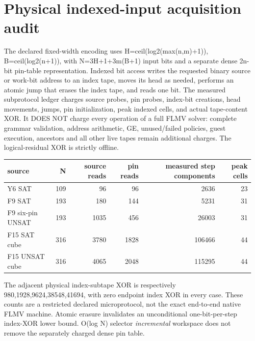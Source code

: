 \documentclass[10pt]{article}
\begin{document}
\section{Physical indexed-input acquisition audit}
The declared fixed-width encoding uses H=ceil(log2(max(n,m)+1)), B=ceil(log2(n+1)), with N=3H+1+3m(B+1) input bits and a separate dense 2n-bit pin-table representation. Indexed bit access writes the requested binary source or work-bit address to an index tape, moves its head as needed, performs an atomic jump that erases the index tape, and reads one bit. The measured subprotocol ledger charges source probes, pin probes, index-bit creations, head movements, jumps, pin initialization, peak indexed cells, and actual tape-content XOR. It DOES NOT charge every operation of a full FLMV solver: complete grammar validation, address arithmetic, GE, unused/failed policies, guest execution, ancestors and all other live tapes remain additional charges. The logical-residual XOR is strictly offline.
\begin{center}
\begin{tabular}{lrrrrr}\hline
source & N & source reads & pin reads & measured step components & peak cells\\\hline
Y6 SAT & 109 & 96 & 96 & 2636 & 23\\
F9 SAT & 193 & 180 & 144 & 5231 & 31\\
F9 six-pin UNSAT &193&1035&456&26003&31\\
F15 SAT cube &316&3780&1828&106466&44\\
F15 UNSAT cube &316&4065&2048&115295&44\\\hline
\end{tabular}
\end{center}
The adjacent physical index-subtape XOR is respectively 980,1928,9624,38548,41694, with zero endpoint index XOR in every case. These counts are a restricted declared microprotocol, not the exact end-to-end native FLMV machine. Atomic erasure invalidates an unconditional one-bit-per-step index-XOR lower bound. O(log N) selector \emph{incremental} workspace does not remove the separately charged dense pin table.
\end{document}
